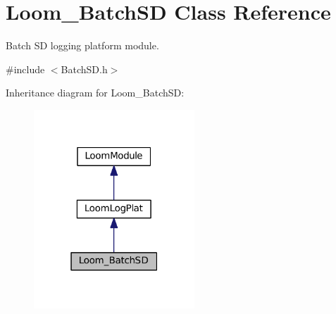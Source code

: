 \hypertarget{class_loom___batch_s_d}{}\section{Loom\+\_\+\+Batch\+SD Class Reference}
\label{class_loom___batch_s_d}


Batch SD logging platform module.  




{\ttfamily \#include $<$Batch\+S\+D.\+h$>$}



Inheritance diagram for Loom\+\_\+\+Batch\+SD\+:\nopagebreak
\begin{figure}[H]
\begin{center}
\leavevmode
\includegraphics[width=171pt]{class_loom___batch_s_d__inherit__graph}
\end{center}
\end{figure}
